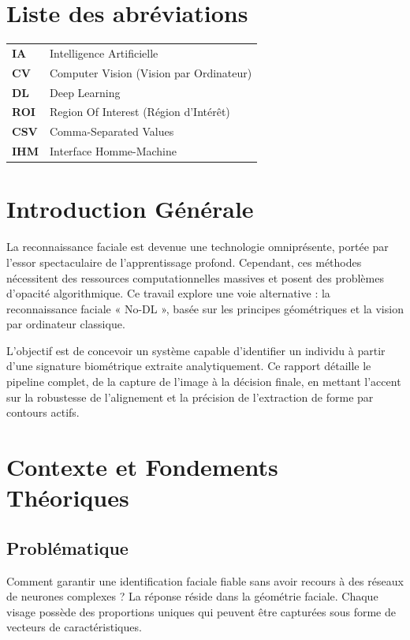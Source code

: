 \documentclass[11pt,a4paper,oneside]{report}
\newenvironment{abbreviations}{
    \renewcommand{\arraystretch}{1.25}
    \begin{tabularx}{\textwidth}{l X}
}{
    \end{tabularx}
}
\begin{document}
\chapter*{Liste des abréviations}
\begin{abbreviations}
    \textbf{IA} & Intelligence Artificielle \\
    \textbf{CV} & Computer Vision (Vision par Ordinateur) \\
    \textbf{DL} & Deep Learning \\
    \textbf{ROI} & Region Of Interest (Région d'Intérêt) \\
    \textbf{CSV} & Comma-Separated Values \\
    \textbf{IHM} & Interface Homme-Machine \\
\end{abbreviations}

\chapter*{Introduction Générale}
La reconnaissance faciale est devenue une technologie omniprésente, portée par l'essor spectaculaire de l'apprentissage profond. Cependant, ces méthodes nécessitent des ressources computationnelles massives et posent des problèmes d'opacité algorithmique. Ce travail explore une voie alternative : la reconnaissance faciale « No-DL », basée sur les principes géométriques et la vision par ordinateur classique.

L'objectif est de concevoir un système capable d'identifier un individu à partir d'une signature biométrique extraite analytiquement. Ce rapport détaille le pipeline complet, de la capture de l'image à la décision finale, en mettant l'accent sur la robustesse de l'alignement et la précision de l'extraction de forme par contours actifs.

\chapter{Contexte et Fondements Théoriques}

\section{Problématique}
Comment garantir une identification faciale fiable sans avoir recours à des réseaux de neurones complexes ? La réponse réside dans la géométrie faciale. Chaque visage possède des proportions uniques qui peuvent être capturées sous forme de vecteurs de caractéristiques.
\end{document}
